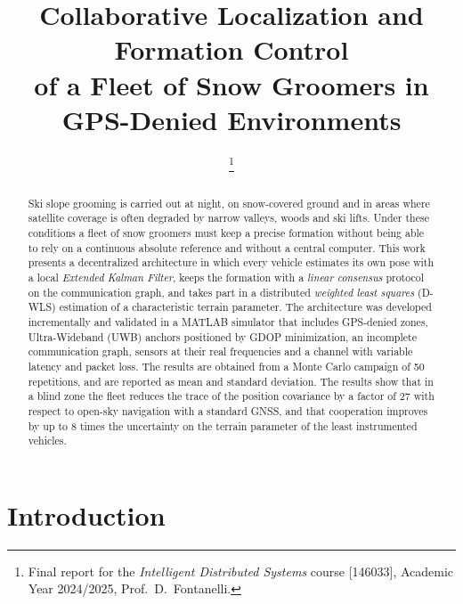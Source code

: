 \documentclass[conference,9pt]{IEEEtran}
\begin{document}
\title{Collaborative Localization and Formation Control\\
of a Fleet of Snow Groomers in GPS-Denied Environments}

\author{
\thanks{Final report for the \emph{Intelligent Distributed Systems} course
[146033], Academic Year 2024/2025, Prof.\ D.\ Fontanelli.}}

\maketitle

\begin{abstract}
Ski slope grooming is carried out at night, on snow-covered ground and in areas
where satellite coverage is often degraded by narrow valleys, woods and ski
lifts. Under these conditions a fleet of snow groomers must keep a precise
formation without being able to rely on a continuous absolute reference and
without a central computer.
This work presents a decentralized architecture in which
every vehicle estimates its own pose with a local \emph{Extended Kalman Filter},
keeps the formation with a \emph{linear consensus} protocol on the
communication graph, and takes part in a distributed \emph{weighted least
squares} (D-WLS) estimation of a characteristic terrain parameter.
The architecture was developed incrementally and validated in a MATLAB
simulator that includes GPS-denied zones, Ultra-Wideband (UWB) anchors
positioned by GDOP minimization, an incomplete communication graph, sensors at
their real frequencies and a channel with variable latency and packet loss.
The results are obtained from a Monte Carlo campaign of 50 repetitions, and are
reported as mean and standard deviation.
The results show that in a blind zone the fleet reduces the trace of the
position covariance by a factor of 27 with respect to open-sky navigation with
a standard GNSS, and that cooperation improves by up to 8 times the
uncertainty on the terrain parameter of the least instrumented vehicles.
\end{abstract}

\section{Introduction}
\end{document}
